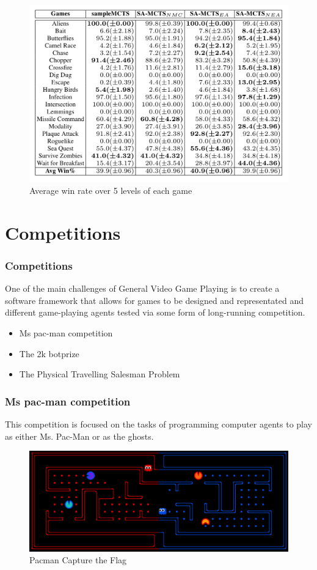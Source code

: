 \documentclass{beamer}
\begin{document}
\begin{frame}[allowframebreaks]
\begin{figure}[c]
  \includegraphics[width=1\linewidth]{figures/figure1}
  \caption{ Average win rate over 5 levels of each game}
\end{figure}

\end{frame}

\section{Competitions}
\begin{frame}
  \frametitle{Competitions}
  One of the main challenges of General Video Game Playing is to create a software framework that allows for games to be designed and representated and different game-playing agents tested via some form of long-running competition. 
  \begin{itemize}
    \item Ms pac-man competition
    \item The 2k botprize
    \item The Physical Travelling Salesman Problem
  \end{itemize}
  
\end{frame}

\begin{frame}
  \frametitle{Ms pac-man competition\cite{2}}
  This competition is focused on the tasks of programming computer agents to play as either Ms. Pac-Man or as the ghosts.
  \begin{figure}
    \includegraphics[width=1\linewidth]{figures/pacman}
    \caption{Pacman Capture the Flag}
  \end{figure}
\end{frame}
\end{document}
